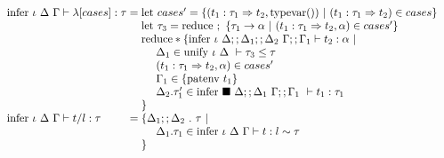 \documentclass[sigplan,screen]{acmart}
\begin{document}
\begin{figure*}[h]
\[\begin{array}{l @{} l}
      \text{infer } \iota\ \Delta\ \Gamma \vdash 
      \lambda[ cases ] : \tau
      &{} =
      \begin{array}[t]{@{} l}
        \text{let } cases' = \{(t_1 : \tau_1 \Rightarrow t_2, \text{typevar}())\ |\ (t_1 : \tau_1 \Rightarrow t_2) \in cases \}
        \\
        \text{let } \tau_3 = \text{reduce } ;\ \{\tau_1 \rightarrow \alpha\ |\ (t_1 : \tau_1 \Rightarrow t_2, \alpha) \in cases' \}
        \\


        \text{reduce} * \{
        \text{infer } \iota\ \Delta;;\Delta_1;;\Delta_2\ \Gamma;;\Gamma_1 \vdash t_2 : \alpha\ |\ 
        \\
        \ \ \ \ \Delta_1 \in \text{unify } \iota\ \Delta\ \vdash \tau_3 \leq \tau
        \\
        \ \ \ \ (t_1 : \tau_1 \Rightarrow t_2, \alpha) \in cases'
        \\
        \ \ \ \ \Gamma_1 \in \{\text{patenv } t_1\}
        \\
        \ \ \ \ \Delta_2.\tau_1' \in \text{infer } \blacksquare\ \Delta;;\Delta_1\ \Gamma;;\Gamma_1\ \vdash t_1 : \tau_1
        \\
        \}
        \\
      \end{array}
      \\

      \text{infer } \iota\ \Delta\ \Gamma \vdash 
      t/l : \tau
      &{} =
      \begin{array}[t]{@{} l}
        \{ \Delta_1;;\Delta_2\ .\ \tau \ |\
        \\
        \ \ \ \ \Delta_1.\tau_1 \in \text{infer } \iota\ \Delta\ \Gamma \vdash t : l \sim \tau 
        \\
        \}
      \end{array}
      \\


\end{array}\]
\end{figure*}
\end{document}
